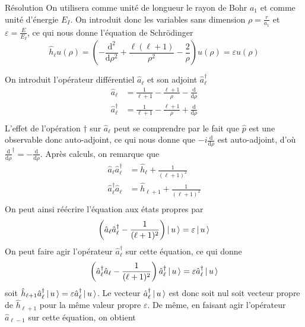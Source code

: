         \begin{demo}{Résolution}
            On utilisera comme unité de longueur le rayon de Bohr $a_1$ et comme unité d’énergie $E_I$. On introduit donc les variables sans dimension $\rho = \frac{r}{a_1}$ et $\varepsilon = \frac{E}{E_I}$, ce qui nous donne l’équation de Schrödinger 
            \[ \hat{h}_{\ell} u(\rho) = \left(-\frac{\text{d}^2}{\text{d}\rho^2}  + \frac{\ell(\ell + 1)}{\rho^2} - \frac{2}{\rho}\right)u(\rho) = \varepsilon u(\rho) \]

            On introduit l’opérateur différentiel $\hat{a}_{\ell}$ et son adjoint $\hat{a}_{\ell}^{\dagger}$ 
            \begin{align*}
                \hat{a}_{\ell} &= \frac{1}{\ell + 1} - \frac{\ell + 1}{\rho} - \frac{\text{d}}{\text{d}\rho} \\
                \hat{a}_{\ell}^{\dagger} &= \frac{1}{\ell + 1} - \frac{\ell + 1}{\rho} + \frac{\text{d}}{\text{d}\rho} \\
            \end{align*}
            L’effet de l’opération $\dagger$ sur $\hat{a}_{\ell}$ peut se comprendre par le fait que $\hat{p}$ est une observable donc auto-adjoint, ce qui nous donne que $- i \frac{\text{d}}{\text{d}\rho}$ est auto-adjoint, d’où $\frac{\text{d}}{\text{d}\rho}^{\dagger} = - \frac{\text{d}}{\text{d}\rho}$. Après calculs, on remarque que 
            \begin{align*}
                \hat{a}_{\ell} \hat{a}_{\ell}^{\dagger} &= \hat{h}_{\ell} + \frac{1}{(\ell + 1)^2} \\
                \hat{a}_{\ell}^{\dagger} \hat{a}_{\ell} &= \hat{h}_{\ell + 1} + \frac{1}{(\ell + 1)^2} \\  
            \end{align*}
            On peut ainsi réécrire l’équation aux états propres par 
            \[ \left(\hat{a}_{\ell} \hat{a}_{\ell}^{\dagger} - \frac{1}{(\ell + 1)^2}\right) \left| \, u \, \right> = \varepsilon \left| \, u \, \right> \]   
            On peut faire agir l’opérateur $\hat{a}_{\ell}^{\dagger}$ sur cette équation, ce qui donne 
            \begin{align*}
                \left( \hat{a}_{\ell}^{\dagger} \hat{a}_{\ell} - \frac{1}{(\ell + 1)^2}\right)\hat{a}_{\ell}^{\dagger} \left| \, u \, \right> = \varepsilon \hat{a}_{\ell}^{\dagger} \left| \, u \, \right>
            \end{align*}
            soit $\hat{h}_{\ell + 1} \hat{a}_{\ell}^{\dagger} \left| \, u \, \right> = \varepsilon \hat{a}_{\ell}^{\dagger} \left| \, u \, \right>$. Le vecteur $\hat{a}_{\ell}^{\dagger} \left| \, u \, \right>$ est donc soit nul soit vecteur propre de $\hat{h}_{\ell + 1}$ pour la même valeur propre $\varepsilon$. De même, en faisant agir l’opérateur $\hat{a}_{\ell - 1}$ sur cette équation, on obtient 

\end{demo}

